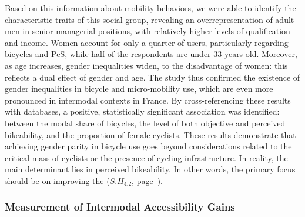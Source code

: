 \begin{refsegment}
Based on this information about mobility behaviors, we were able to identify the characteristic traits of this social group, revealing an overrepresentation of adult men in senior managerial positions, with relatively higher levels of qualification and income. Women account for only a quarter of users, particularly regarding bicycles and \acrshort{PeS}, while half of the respondents are under 33 years old. Moreover, as age increases, gender inequalities widen, to the disadvantage of women: this reflects a dual effect of gender and age. The study thus confirmed the existence of gender inequalities in bicycle and micro-mobility use, which are even more pronounced in intermodal contexts in France. By cross-referencing these results with databases, a positive, statistically significant association was identified: between the modal share of bicycles, the level of both objective and perceived bikeability, and the proportion of female cyclists. These results demonstrate that achieving gender parity in bicycle use goes beyond considerations related to the critical mass of cyclists or the presence of cycling infrastructure. In reality, the main determinant lies in perceived bikeability. In other words, the primary focus should be on improving the  (\hyperref[sous-hypothese-4.2]{\(S.H_{4.2}\)}, page~\pageref{sous-hypothese-4.2}).%

\subsubsection*{Measurement of Intermodal Accessibility Gains
    \label{conclusion-generale:principaux-apports-chapitre5}
    }


\end{refsegment}
